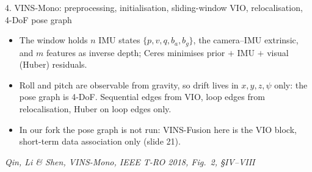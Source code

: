 \documentclass[11pt,aspectratio=169]{beamer}
\newcommand{\src}[1]{\vfill{\tiny\color{black!55}#1}}
\newcommand{\paper}[1]{\textit{#1}}
\begin{document}
\begin{frame}{4. VINS-Mono: preprocessing, initialisation, sliding-window VIO, relocalisation, 4-DoF pose graph}
{}
  \par\vspace{0.3em}
  \scriptsize
  \begin{itemize}
    \item The window holds $n$ IMU states $\{p,v,q,b_a,b_g\}$, the camera--IMU
          extrinsic, and $m$ features as inverse depth; Ceres minimises prior
          $+$ IMU $+$ visual (Huber) residuals.
    \item Roll and pitch are observable from gravity, so drift lives in
          $x,y,z,\psi$ only: the pose graph is 4-DoF. Sequential edges from VIO,
          loop edges from relocalisation, Huber on loop edges only.
    \item In our fork the pose graph is not run: VINS-Fusion here is the VIO
          block, short-term data association only (slide 21).
  \end{itemize}
  \src{\paper{Qin, Li \& Shen, VINS-Mono, IEEE T-RO 2018, Fig.~2, §IV--VIII}}
\end{frame}
\end{document}
